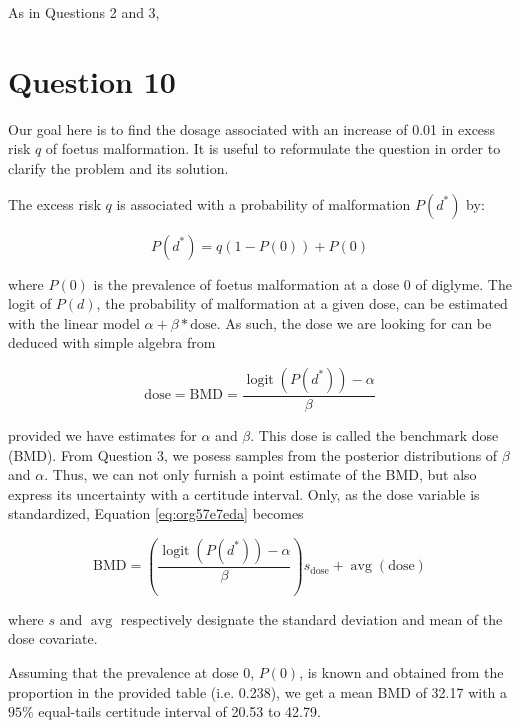 \documentclass[11pt]{article}
\begin{document}
As in Questions 2 and 3, 

\section{Question 10}
\label{sec:org0bbe795}
Our goal here is to find the dosage associated with an increase of
0.01 in excess risk \(q\) of foetus malformation. It is useful to
reformulate the question in order to clarify the problem and its
solution.

The excess risk \(q\) is associated with a probability of malformation
\(P(d^{*})\) by:

\begin{equation}
P(d^{*})=q(1-P(0)) + P(0)
\end{equation}

where \(P(0)\) is the prevalence of foetus malformation at a dose 0 of
diglyme. The logit of \(P(d)\), the probability of malformation at a
given dose, can be estimated with the linear model \(\alpha + \beta*
\mathrm{dose}\). As such, the dose we are looking for can be deduced
with simple algebra from

\begin{equation}
\label{eq:org57e7eda}
\mathrm{dose}=\mathrm{BMD}=\frac{\operatorname{logit}(P(d^{*})) 
- \alpha}{\beta}
\end{equation}

provided we have estimates for \(\alpha\) and \(\beta\). This dose is
called the benchmark dose (BMD). From Question 3, we posess samples
from the posterior distributions of \(\beta\) and \(\alpha\). Thus, we can
not only furnish a point estimate of the BMD, but also express its
uncertainty with a certitude interval. Only, as the dose variable is
standardized, Equation \ref{eq:org57e7eda} becomes

\begin{equation}
\mathrm{BMD}=\left(\frac{\operatorname{logit}(P(d^{*})) - \alpha}
{\beta}\right) s_{\mathrm{dose}} + \operatorname{avg}(\mathrm{dose})
\end{equation}

where \(s\) and \(\operatorname{avg}\) respectively designate the standard
deviation and mean of the dose covariate.

Assuming that the prevalence at dose 0, \(P(0)\), is known and obtained
from the proportion in the provided table (i.e. 0.238), we get a mean
BMD of 32.17 with a \(95\%\) equal-tails certitude interval of 20.53 to
42.79.
\end{document}
